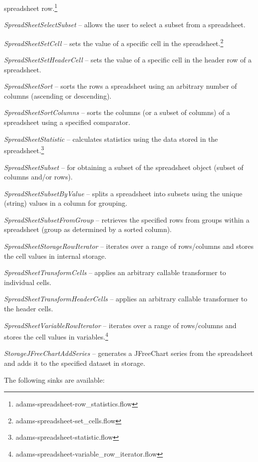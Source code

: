 \documentclass[a4paper]{book}
\begin{document}
\begin{tight_itemize}
	spreadsheet row.\footnote{adams-spreadsheet-row\_statistics.flow}
	\item \textit{SpreadSheetSelectSubset} -- allows the user to select a
	subset from a spreadsheet.
	\item \textit{SpreadSheetSetCell} -- sets the value of a specific cell
	in the spreadsheet.\footnote{adams-spreadsheet-set\_cells.flow}
	\item \textit{SpreadSheetSetHeaderCell} -- sets the value of a specific cell
	in the header row of a spreadsheet.
	\item \textit{SpreadSheetSort} -- sorts the rows a spreadsheet using an arbitrary
	number of columns (ascending or descending).
	\item \textit{SpreadSheetSortColumns} -- sorts the columns (or a subset of
	columns) of a spreadsheet using a specified comparator.
	\item \textit{SpreadSheetStatistic} -- calculates statistics using the
	data stored in the spreadsheet.\footnote{adams-spreadsheet-statistic.flow}
	\item \textit{SpreadSheetSubset} -- for obtaining a subset of the 
	spreadsheet object (subset of columns and/or rows).
	\item \textit{SpreadSheetSubsetByValue} -- splits a spreadsheet into 
	subsets using the unique (string) values in a column for grouping.
	\item \textit{SpreadSheetSubsetFromGroup} -- retrieves the specified
	rows from groups within a spreadsheet (group as determined by a sorted column).
	\item \textit{SpreadSheetStorageRowIterator} -- iterates over a range of
	rows/columns and stores the cell values in internal storage.
	\item \textit{SpreadSheetTransformCells} -- applies an arbitrary callable
	transformer to individual cells.
	\item \textit{SpreadSheetTransformHeaderCells} -- applies an arbitrary callable
	transformer to the header cells.
	\item \textit{SpreadSheetVariableRowIterator} -- iterates over a range of 
	rows/columns and stores the cell values in 
	variables.\footnote{adams-spreadsheet-variable\_row\_iterator.flow}
	\item \textit{StorageJFreeChartAddSeries} -- generates a JFreeChart\cite{jfreechart}
	series from the spreadsheet and adds it to the specified dataset in storage.
\end{tight_itemize}
The following sinks are available:
\end{document}

